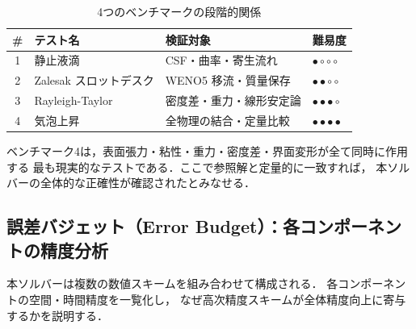 \begin{table}[h]
\centering
\caption{4つのベンチマークの段階的関係}
\renewcommand{\arraystretch}{1.3}
\begin{tabular}{clll}
\hline
\# & テスト名 & 検証対象 & 難易度 \\
\hline
1 & 静止液滴 & CSF・曲率・寄生流れ & $\bullet\circ\circ\circ$ \\
2 & Zalesak スロットデスク & WENO5 移流・質量保存 & $\bullet\bullet\circ\circ$ \\
3 & Rayleigh-Taylor & 密度差・重力・線形安定論 & $\bullet\bullet\bullet\circ$ \\
4 & 気泡上昇 & 全物理の結合・定量比較 & $\bullet\bullet\bullet\bullet$ \\
\hline
\end{tabular}
\end{table}

ベンチマーク4は，表面張力・粘性・重力・密度差・界面変形が全て同時に作用する
最も現実的なテストである．ここで参照解と定量的に一致すれば，
本ソルバーの全体的な正確性が確認されたとみなせる．

\subsection{誤差バジェット（Error Budget）：各コンポーネントの精度分析}
\label{sec:error_budget}

本ソルバーは複数の数値スキームを組み合わせて構成される．
各コンポーネントの空間・時間精度を一覧化し，
なぜ高次精度スキームが全体精度向上に寄与するかを説明する．

